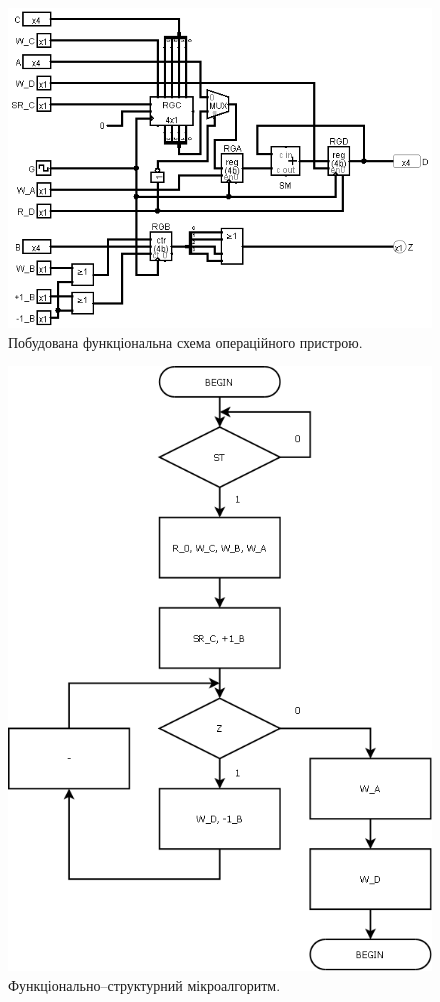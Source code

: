 \documentclass[a4paper, 10pt]{article}
\begin{document}
\begin{figure}[h!]
\begin{center}
\includegraphics[scale=0.5]{od_circ.png}
\caption{Побудована функціональна схема операційного пристрою.}
\end{center}
\end{figure}


\begin{figure}[H]
\begin{center}
\includegraphics[scale=0.25]{fs_alg.png}
\caption{Функціонально--структурний мікроалгоритм.}
\end{center}
\end{figure}
\end{document}
